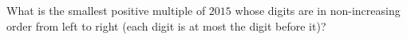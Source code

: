 What is the smallest positive multiple of $2015$ whose digits are in non-increasing order from left to right (each digit is at most the digit before it)?
